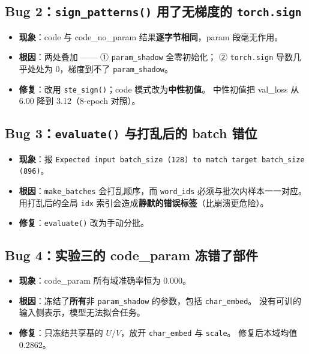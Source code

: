 \documentclass[11pt,a4paper]{ctexart}
\begin{document}
\subsection{Bug 2：\texttt{sign\_patterns()} 用了无梯度的 \texttt{torch.sign}}

\begin{itemize}
\item \textbf{现象}：code 与 code\_no\_param 结果\textbf{逐字节相同}，param 段毫无作用。
\item \textbf{根因}：两处叠加 —— ① \texttt{param\_shadow} 全零初始化；
      ② \texttt{torch.sign} 导数几乎处处为 0，梯度到不了 \texttt{param\_shadow}。
\item \textbf{修复}：改用 \texttt{ste\_sign()}；code 模式改为\textbf{中性初值}。
      中性初值把 val\_loss 从 6.00 降到 3.12（8-epoch 对照）。
\end{itemize}

\subsection{Bug 3：\texttt{evaluate()} 与打乱后的 batch 错位}

\begin{itemize}
\item \textbf{现象}：报 \texttt{Expected input batch\_size (128) to match target batch\_size (896)}。
\item \textbf{根因}：\texttt{make\_batches} 会打乱顺序，而 \texttt{word\_ids} 必须与批次内样本一一对应。
      用打乱后的全局 \texttt{idx} 索引会造成\textbf{静默的错误标签}（比崩溃更危险）。
\item \textbf{修复}：\texttt{evaluate()} 改为手动分批。
\end{itemize}

\subsection{Bug 4：实验三的 code\_param 冻错了部件}

\begin{itemize}
\item \textbf{现象}：code\_param 所有域准确率恒为 0.000。
\item \textbf{根因}：冻结了\textbf{所有}非 \texttt{param\_shadow} 的参数，包括 \texttt{char\_embed}。
      没有可训的输入侧表示，模型无法拟合任务。
\item \textbf{修复}：只冻结共享基的 $U/V$，放开 \texttt{char\_embed} 与 \texttt{scale}。
      修复后本域均值 0.2862。
\end{itemize}
\end{document}
